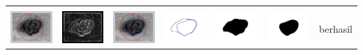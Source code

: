 \begin{table}[H]
\begin{tabular}{|m{0.7in}|m{0.7in}|m{0.7in}|m{0.7in}|m{0.7in}|m{0.7in}|m{0.7in}|}
		&  &  & & & &  \\
		\includegraphics[width=0.7in]{dataset/dataset_3/luka_hitam/ready/29_interp_init.jpg}&
		\includegraphics[width=0.7in]{dataset/dataset_3/luka_hitam/ready/29_interp_ext.jpg}&
		\includegraphics[width=0.7in]{dataset/dataset_3/luka_hitam/ready/29_interp_result.jpg}&
		\includegraphics[width=0.7in]{dataset/dataset_3/luka_hitam/ready/29_gt_r.jpg}&
		\includegraphics[width=0.7in]{dataset/dataset_3/luka_hitam/ready/29_r.jpg}&
		\includegraphics[width=0.7in]{dataset/dataset_3/luka_hitam/ready/29_interp_r.jpg}&
		berhasil\\
		\hline
		

\end{tabular}
\end{table}
